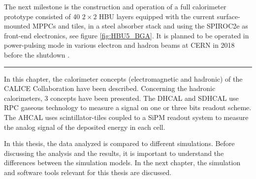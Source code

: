 The next milestone is the construction and operation of a full calorimeter prototype consisted of 40 $2\times2$ HBU layers equipped with the current surface-mounted MPPCs and tiles, in a steel absorber stack and using the SPIROC2e as front-end electronics, see figure \ref{fig:HBU5_BGA}. It is planned to be operated in power-pulsing mode in various electron and hadron beams at CERN in 2018 before the shutdown \cite{Felix:AHCALMain2017}.

\begin{center}
  \rule{0.5\textwidth}{.4pt}
\end{center}

In this chapter, the calorimeter concepts (electromagnetic and hadronic) of the CALICE Collaboration have been described. Concerning the hadronic calorimeters, 3 concepts have been presented. The DHCAL and SDHCAL use RPC gaseous technology to measure a signal on one or three bits readout scheme. The AHCAL uses scintillator-tiles coupled to a SiPM readout system to measure the analog signal of the deposited energy in each cell.

In this thesis, the data analyzed is compared to different simulations. Before discussing the analysis and the results, it is important to understand the differences between the simulation models. In the next chapter, the simulation and software tools relevant for this thesis are discussed.
